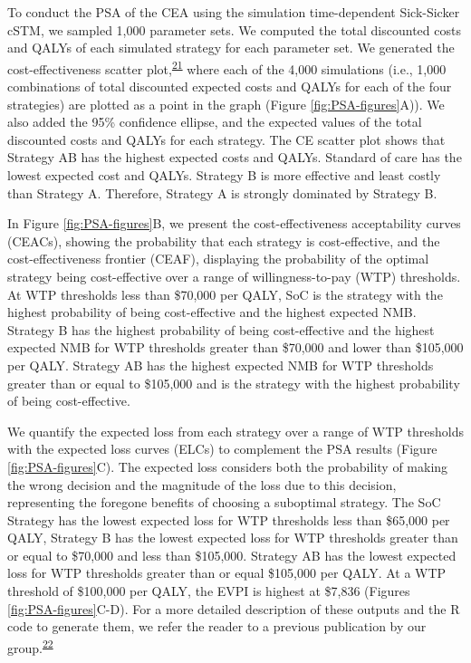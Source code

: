 \documentclass[
]{article}
\begin{document}
To conduct the PSA of the CEA using the simulation time-dependent Sick-Sicker cSTM, we sampled 1,000 parameter sets. We computed the total discounted costs and QALYs of each simulated strategy for each parameter set. We generated the cost-effectiveness scatter plot,\textsuperscript{\protect\hyperlink{ref-Briggs2002}{21}} where each of the 4,000 simulations (i.e., 1,000 combinations of total discounted expected costs and QALYs for each of the four strategies) are plotted as a point in the graph (Figure \ref{fig:PSA-figures}A)). We also added the 95\% confidence ellipse, and the expected values of the total discounted costs and QALYs for each strategy. The CE scatter plot shows that Strategy AB has the highest expected costs and QALYs. Standard of care has the lowest expected cost and QALYs. Strategy B is more effective and least costly than Strategy A. Therefore, Strategy A is strongly dominated by Strategy B.

In Figure \ref{fig:PSA-figures}B, we present the cost-effectiveness acceptability curves (CEACs), showing the probability that each strategy is cost-effective, and the cost-effectiveness frontier (CEAF), displaying the probability of the optimal strategy being cost-effective over a range of willingness-to-pay (WTP) thresholds. At WTP thresholds less than \$70,000 per QALY, SoC is the strategy with the highest probability of being cost-effective and the highest expected NMB. Strategy B has the highest probability of being cost-effective and the highest expected NMB for WTP thresholds greater than \$70,000 and lower than \$105,000 per QALY. Strategy AB has the highest expected NMB for WTP thresholds greater than or equal to \$105,000 and is the strategy with the highest probability of being cost-effective.

We quantify the expected loss from each strategy over a range of WTP thresholds with the expected loss curves (ELCs) to complement the PSA results (Figure \ref{fig:PSA-figures}C). The expected loss considers both the probability of making the wrong decision and the magnitude of the loss due to this decision, representing the foregone benefits of choosing a suboptimal strategy. The SoC Strategy has the lowest expected loss for WTP thresholds less than \$65,000 per QALY, Strategy B has the lowest expected loss for WTP thresholds greater than or equal to \$70,000 and less than \$105,000. Strategy AB has the lowest expected loss for WTP thresholds greater than or equal \$105,000 per QALY. At a WTP threshold of \$100,000 per QALY, the EVPI is highest at \$7,836 (Figures \ref{fig:PSA-figures}C-D). For a more detailed description of these outputs and the R code to generate them, we refer the reader to a previous publication by our group.\textsuperscript{\protect\hyperlink{ref-Alarid-Escudero2019}{22}}
\end{document}
